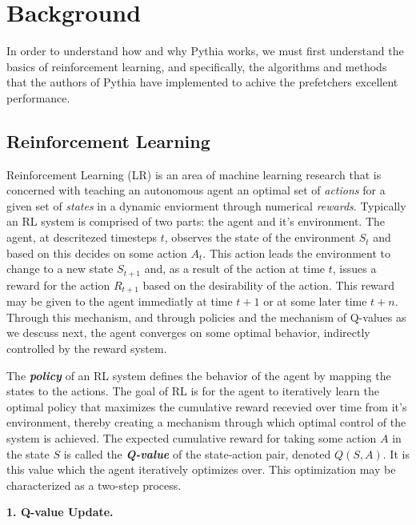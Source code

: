 \section{Background}
In order to understand how and why Pythia works, we must first understand the basics 
of reinforcement learning, and specifically, the algorithms and methods that the authors of
Pythia have implemented to achive the prefetchers excellent performance.

\subsection{Reinforcement Learning}
Reinforcement Learning (LR) \cite{reinforcement_learning, pythia} is an area of machine learning 
research that is concerned with teaching an autonomous agent an optimal set of \textit{actions} for
a given set of \textit{states} in a dynamic enviorment through numerical \textit{rewards}. Typically 
an RL system is comprised of two parts: the agent and it's environment. The agent, at descritezed 
timesteps $t$, observes the state of the environment $S_t$ and based on this decides on some action
$A_t$. This action leads the environment to change to a new state $S_{t+1}$ and, as a result of the 
action at time $t$, issues a reward for the action $R_{t+1}$ based on the desirability of the action.
This reward may be given to the agent immediatly at time $t+1$ or at some later time $t+n$. Through this 
mechanism, and through policies and the mechanism of Q-values as we descuss next, the agent converges on some optimal 
behavior, indirectly controlled by the reward system.

The \textbf{\textit{policy }} of an RL system defines the behavior of the agent by mapping the 
states to the actions. The goal of RL is for the agent to iteratively learn the optimal policy 
that maximizes the cumulative reward recevied over time from it's environment, thereby creating 
a mechanism through which optimal control of the system is achieved. The expected cumulative reward 
for taking some action $A$ in the state $S$ is called the \textbf{\textit{Q-value}} of the state-action
pair, denoted $Q(S, A)$. It is this value which the agent iteratively optimizes over. This optimization
may be characterized as a two-step process.

\textbf{1. Q-value Update.} 
